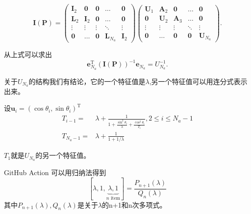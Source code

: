 \documentclass[notheorems,xetex]{beamer}
\theoremstyle{definition}
\begin{document}
\begin{frame}[noframenumbering]
\begin{equation*}\label{eq:LU}
  \bm{I}(\bm{P})=\begin{pmatrix}
                 \bm{I}_2 & \bm{0} & \bm{0} & \dots & \bm{0} \\
                 \bm{L}_2 & \bm{I}_2 & \bm{0} & \dots & \bm{0} \\
                 \vdots & \vdots & \vdots & \ddots & \vdots \\
                 \bm{0} & \dots & \bm{0} & \bm{L}_{N_a} & \bm{I}_{2}
               \end{pmatrix}\begin{pmatrix}
                 \bm{U}_1 & \bm{A}_2 & \bm{0} & \dots & \bm{0} \\
                 \bm{0} & \bm{U}_2 & \bm{A}_3 & \dots & \bm{0} \\
                 \vdots & \vdots & \vdots & \ddots & \vdots \\
                 \bm{0} & \dots & \bm{0} & \bm{0} & \bm{U}_{N_a}
               \end{pmatrix}.
\end{equation*}

从上式可以求出
\begin{equation*}\label{eq:thomas_final}
\bm{e}_{N_a}^{\textrm{T}}(\bm{I}(\bm{P}))^{-1}\bm{e}_{N_a}=U_{N_a}^{-1}.
\end{equation*}
\pause

关于$U_{N_a}$的结构我们有结论，它的一个特征值是$\lambda$,另一个特征值可以用连分式表示出来。
\end{frame}
\begin{frame}[noframenumbering]
设$\bm{u}_i=(\cos\theta_i,\sin\theta_i)^{\textrm{T}}$
\begin{equation*}
\begin{split}
T_{i-1} =& \lambda + \frac{1}{1+\frac{\sin^2\theta_i}{\lambda}+\frac{\cos^2\theta_i}{T_i}},2\leq i\leq N_a-1\\
T_{N_a-1}  =& \lambda+\frac{1}{1+1/\lambda}
\end{split}
\end{equation*}

$T_1$就是$U_{N_a}$的另一个特征值。
\end{frame}
\begin{frame}[noframenumbering]{GitHub Action}
可以用归纳法得到
\[
[\lambda,1,\underbrace{\lambda,1}_{\text{$n$ item}}]=\frac{P_{n+1}(\lambda)}{Q_n(\lambda)}
\]
其中$P_{n+1}(\lambda),Q_n(\lambda)$是关于$\lambda$的n+1和n次多项式。
\end{frame}
\end{document}
